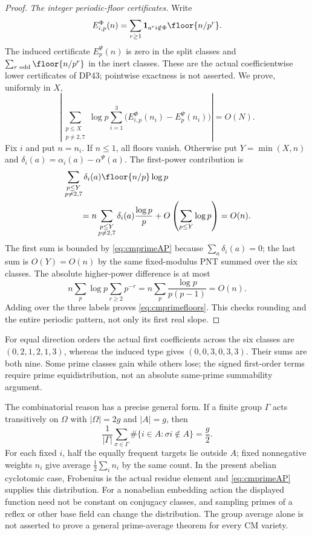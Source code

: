 \documentclass[11pt,a4paper]{article}
\theoremstyle{definition}\newtheorem{remark}[theorem]{Remark}
\begin{document}
\begin{proof}
\emph{The integer periodic-floor certificates.}
Write
\[
 E_{i,p}^\Phi(n)
       =\sum_{r\ge1}\mathbf1_{a^ri\notin\Phi}
          \floor{n/p^r}.
\]
The induced certificate $E_p^\Psi(n)$ is zero in the split classes and
$\sum_{r\text{ odd}}\floor{n/p^r}$ in the inert classes.
These are the actual coefficientwise lower certificates of DP43; pointwise exactness is not asserted.
We prove, uniformly in $X$,
\begin{equation}\label{eq:cmprimefloors}
 \left|\sum_{\substack{p\le X\\p\ne2,7}}\log p
       \sum_{i=1}^3\bigl(E_{i,p}^\Phi(n_i)-E_p^\Psi(n_i)\bigr)\right|
       =O(N).
\end{equation}
Fix $i$ and put $n=n_i$. If $n\le1$, all floors vanish.
Otherwise put $Y=\min(X,n)$ and $\delta_i(a)=\alpha_i(a)-\alpha^\Psi(a)$.
The first-power contribution is
\begin{align*}
 &\sum_{\substack{p\le Y\\p\ne2,7}}
       \delta_i(a)\floor{n/p}\log p\\
 &\qquad=n\sum_{\substack{p\le Y\\p\ne2,7}}
       \delta_i(a)\frac{\log p}{p}
       +O\left(\sum_{p\le Y}\log p\right)=O(n).
\end{align*}
The first sum is bounded by \eqref{eq:cmprimeAP} because $\sum_a\delta_i(a)=0$; the last sum is $O(Y)=O(n)$ by the same fixed-modulus PNT summed over the six classes.
The absolute higher-power difference is at most
\[
 n\sum_p\log p\sum_{r\ge2}p^{-r}
       =n\sum_p\frac{\log p}{p(p-1)}=O(n).
\]
Adding over the three labels proves \eqref{eq:cmprimefloors}.
This checks rounding and the entire periodic pattern, not only its first real slope.
\end{proof}

For equal direction orders the actual first coefficients across the six classes are $(0,2,1,2,1,3)$, whereas the induced type gives $(0,0,3,0,3,3)$. Their sums are both nine. Some prime classes gain while others lose; the signed first-order terms require prime equidistribution, not an absolute same-prime summability argument.

The combinatorial reason has a precise general form. If a finite group $\Gamma$ acts transitively on $\Omega$ with $|\Omega|=2g$ and $|A|=g$, then
\[
 \frac1{|\Gamma|}\sum_{\sigma\in\Gamma}
       \#\{i\in A:\sigma i\notin A\}=\frac g2.
\]
For each fixed $i$, half the equally frequent targets lie outside $A$; fixed nonnegative weights $n_i$ give average $\tfrac12\sum_i n_i$ by the same count.
In the present abelian cyclotomic case, Frobenius is the actual residue element and \eqref{eq:cmprimeAP} supplies this distribution. For a nonabelian embedding action the displayed function need not be constant on conjugacy classes, and sampling primes of a reflex or other base field can change the distribution. The group average alone is not asserted to prove a general prime-average theorem for every CM variety.
\end{document}
